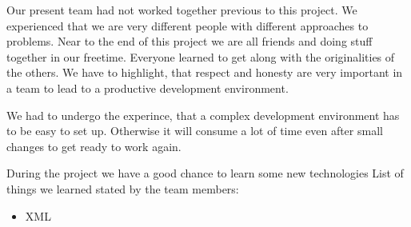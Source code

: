 Our present team had not worked together previous to this project. We experienced that we are very different people with different approaches to problems. Near to the end of this project we are all friends and doing stuff together in our freetime. Everyone learned to get along with the originalities of the others. We have to highlight, that respect and honesty are very important in a team to lead to a productive development environment.

We had to undergo the experince, that a complex development environment has to be easy to set up. Otherwise it will consume a lot of time even after small changes to get ready to work again.

During  the  project  we  have  a  good  chance  to  learn  some  new  technologies
List of things we learned stated by the team members:
\begin{itemize}
	\item XML
\end{itemize}
